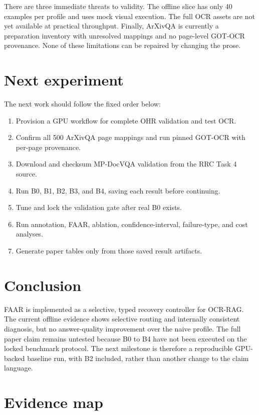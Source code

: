 \documentclass[10pt,twocolumn]{article}
\begin{document}
There are three immediate threats to validity. The offline slice has only 40 examples per profile and uses mock visual execution. The full OCR assets are not yet available at practical throughput. Finally, ArXivQA is currently a preparation inventory with unresolved mappings and no page-level GOT-OCR provenance. None of these limitations can be repaired by changing the prose.

\section{Next experiment}

The next work should follow the fixed order below:

\begin{enumerate}[leftmargin=1.4em]
  \item Provision a GPU workflow for complete OHR validation and test OCR.
  \item Confirm all 500 ArXivQA page mappings and run pinned GOT-OCR with per-page provenance.
  \item Download and checksum MP-DocVQA validation from the RRC Task 4 source.
  \item Run B0, B1, B2, B3, and B4, saving each result before continuing.
  \item Tune and lock the validation gate after real B0 exists.
  \item Run annotation, FAAR, ablation, confidence-interval, failure-type, and cost analyses.
  \item Generate paper tables only from those saved result artifacts.
\end{enumerate}

\section{Conclusion}

FAAR is implemented as a selective, typed recovery controller for OCR-RAG. The current offline evidence shows selective routing and internally consistent diagnosis, but no answer-quality improvement over the naive profile. The full paper claim remains untested because B0 to B4 have not been executed on the locked benchmark protocol. The next milestone is therefore a reproducible GPU-backed baseline run, with B2 included, rather than another change to the claim language.

\balance
\clearpage
\onecolumn
\appendix

\section{Evidence map}
\label{app:evidence}
\end{document}
